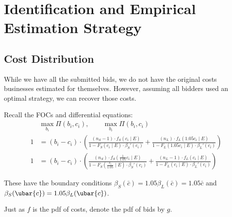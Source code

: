 \section{Identification and Empirical Estimation Strategy}

\subsection{Cost Distribution}

While we have all the submitted bids, we do not have the original costs
businesses estimated for themselves. However, assuming all bidders used
an optimal strategy, we can recover those costs.

Recall the FOCs and differential equations:
\[
  \begin{aligned}
  & \max_{b_i} \Pi(b_i, c_i), \qquad \max_{b_i} \Pi(b_i, c_i) \\
  1 &= (b_i - c_i) \cdot \left(
    \frac{(n_S - 1) \cdot f_S(c_i \mid E)}{1 - F_S(c_i \mid E) \cdot \beta_S'(c_i)} +
    \frac{(n_L) \cdot f_L(1.05 c_i \mid E)}{1 - F_L(1.05 c_i \mid E) \cdot \beta_L'(c_i)} \right) \\
  1 &= (b_i - c_i) \cdot \left(
    \frac{(n_S) \cdot f_S(\frac{1}{1.05} c_i \mid E)}{1 - F_S(\frac{c_i}{1.05} \mid E) \cdot \beta_S'(c_i)} +
    \frac{(n_L - 1) \cdot f_L(c_i \mid E)}{1 - F_L(c_i \mid E) \cdot \beta_L'(c_i)} \right)
  \end{aligned}
\]

These have the boundary conditions \( \beta_S(\bar{c}) = 1.05 \beta_L(\bar{c}) = 1.05\bar{c}\)
and \(\beta_S(\ubar{c}) = 1.05\beta_L(\ubar{c})\).

Just as \(f\) is the pdf of costs, denote the pdf of bids by \(g\).

\vspace{0.2cm}

